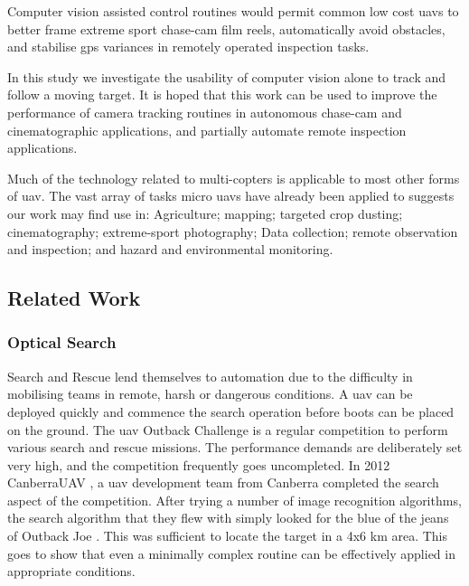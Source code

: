 \documentclass[a4paper, 11pt, titlepage]{article}
\begin{document}
      Computer vision assisted control routines would permit common low cost \glspl{uav} to better frame extreme sport chase-cam film reels, automatically avoid obstacles, and stabilise \gls{gps} variances in remotely operated inspection tasks.

      In this study we investigate the usability of computer vision alone to track and follow a moving target.  It is hoped that this work can be used to improve the performance of camera tracking routines in autonomous chase-cam and cinematographic applications, and partially automate remote inspection applications.

      Much of the technology related to multi-copters is applicable to most other forms of \gls{uav}.  The vast array of tasks micro \glspl{uav} have already been applied to suggests our work may find use in: Agriculture; mapping; targeted crop dusting; cinematography; extreme-sport photography; Data collection; remote observation and inspection; and hazard and environmental monitoring.
    \subsection{Related Work}
      \subsubsection{Optical Search}
        Search and Rescue lend themselves to automation due to the difficulty in mobilising teams in remote, harsh or dangerous conditions.  A \gls{uav} can be deployed quickly and commence the search operation before boots can be placed on the ground.
        The \gls{uav} Outback Challenge \cite{OutbackChallenge} is a regular competition to perform various search and rescue missions.  The performance demands are deliberately set very high, and the competition frequently goes uncompleted.  
        In 2012 CanberraUAV \cite{canberrauav}, a \gls{uav} development team from Canberra completed the search aspect of the competition.
        After trying a number of image recognition algorithms, the search algorithm that they flew with simply looked for the blue of the jeans of Outback Joe \cite{tridge}. This was sufficient to locate the target in a 4x6 km area.  This goes to show that even a minimally complex routine can be effectively applied in appropriate conditions.
\end{document}
